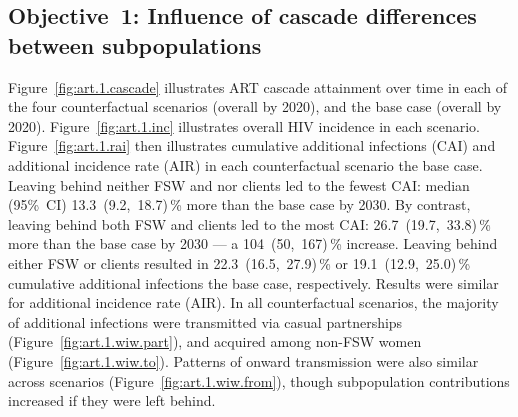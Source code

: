 \subsection{Objective~1: Influence of cascade differences between subpopulations}\label{art.res.1}
Figure~\ref{fig:art.1.cascade} illustrates ART cascade attainment over time
in each of the four counterfactual scenarios (\casmd overall by 2020),
and the base case (\cashi overall by 2020).
Figure~\ref{fig:art.1.inc} illustrates overall HIV incidence in each scenario.
Figure~\ref{fig:art.1.rai} then illustrates
cumulative additional infections (CAI) and additional incidence rate (AIR)
in each counterfactual scenario \vs the base case.
Leaving behind neither FSW and nor clients led to the fewest CAI: median (95\%~CI)
13.3~(9.2,~18.7)\,\% more than the base case by 2030. %
By contrast, leaving behind both FSW and clients led to the most CAI:
26.7~(19.7,~33.8)\,\% more than the base case by 2030 %
--- a 104~(50,~167)\,\% increase. %
Leaving behind either FSW or clients resulted in
22.3~(16.5,~27.9)\,\% or 19.1~(12.9,~25.0)\,\% cumulative additional infections
\vs the base case, respectively. %
Results were similar for additional incidence rate (AIR).
In all counterfactual scenarios, the majority of additional infections were
transmitted via casual partnerships (Figure~\ref{fig:art.1.wiw.part}), %
and acquired among non-FSW women (Figure~\ref{fig:art.1.wiw.to}). %
Patterns of onward transmission were also similar across scenarios %
(Figure~\ref{fig:art.1.wiw.from}),
though subpopulation contributions increased if they were left behind.
